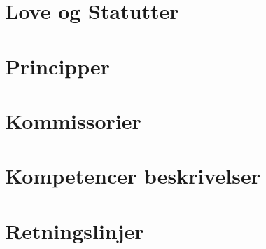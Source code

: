 \documentclass[a4paper,danish,12pt,twoside,openright]{report}
\begin{document}

\clearpage
\tableofcontents
\newpage

\newpage

\part{Love og Statutter}
\setcounter{section}{0}



\newpage


\part{Principper}
\setcounter{section}{0}








\newpage

\part{Kommissorier}
\setcounter{section}{0}






\part{Kompetencer beskrivelser}
\setcounter{section}{0}



\part{Retningslinjer}
\setcounter{section}{0}


%

\end{document}
